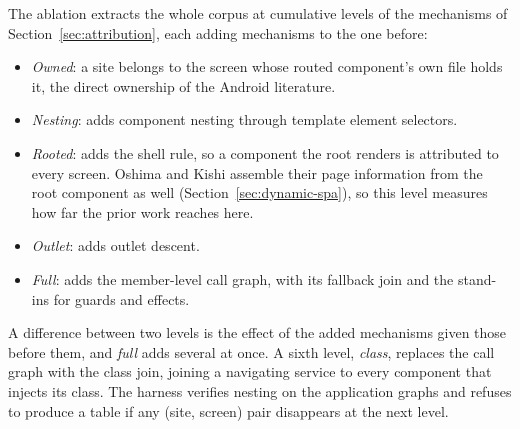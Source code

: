 The ablation extracts the whole corpus at \AblationLevels{} cumulative levels of the mechanisms of
Section~\ref{sec:attribution}, each adding mechanisms to the one before:
\begin{itemize}
\item \emph{Owned}: a site belongs to the screen whose routed component's own file holds it, the
direct ownership of the Android literature.
\item \emph{Nesting}: adds component nesting through template element selectors.
\item \emph{Rooted}: adds the shell rule, so a component the root renders is attributed to every
screen. Oshima and Kishi assemble their page information from the root component as well
(Section~\ref{sec:dynamic-spa}), so this level measures how far the prior work reaches here.
\item \emph{Outlet}: adds outlet descent.
\item \emph{Full}: adds the member-level call graph, with its fallback join and the stand-ins for
guards and effects.
\end{itemize}
A difference between two levels is the effect of the added mechanisms given those before them,
and \emph{full} adds several at once. A sixth level,
\emph{class}, replaces the call graph with the class join, joining a navigating service to every
component that injects its class. The harness verifies nesting on the application graphs and refuses
to produce a table if any (site, screen) pair disappears at the next level.

